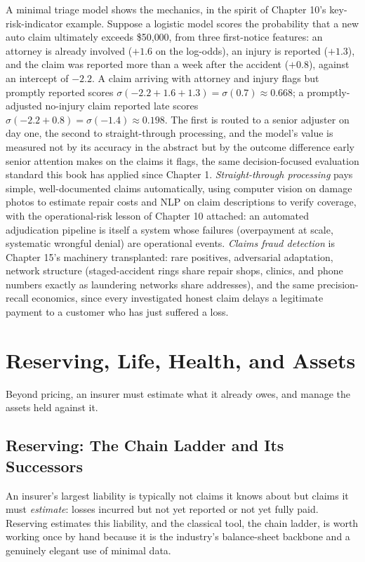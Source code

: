 \documentclass[../ai_in_finance]{subfiles}
\begin{document}
A minimal triage model shows the mechanics, in the spirit of Chapter 10's key-risk-indicator example. Suppose a logistic model scores the probability that a new auto claim ultimately exceeds \$50{,}000, from three first-notice features: an attorney is already involved ($+1.6$ on the log-odds), an injury is reported ($+1.3$), and the claim was reported more than a week after the accident ($+0.8$), against an intercept of $-2.2$. A claim arriving with attorney and injury flags but promptly reported scores $\sigma(-2.2 + 1.6 + 1.3) = \sigma(0.7) \approx 0.668$; a promptly-adjusted no-injury claim reported late scores $\sigma(-2.2 + 0.8) = \sigma(-1.4) \approx 0.198$. The first is routed to a senior adjuster on day one, the second to straight-through processing, and the model's value is measured not by its accuracy in the abstract but by the outcome difference early senior attention makes on the claims it flags, the same decision-focused evaluation standard this book has applied since Chapter 1. \emph{Straight-through processing} pays simple, well-documented claims automatically, using computer vision on damage photos to estimate repair costs and NLP on claim descriptions to verify coverage, with the operational-risk lesson of Chapter 10 attached: an automated adjudication pipeline is itself a system whose failures (overpayment at scale, systematic wrongful denial) are operational events. \emph{Claims fraud detection} is Chapter 15's machinery transplanted: rare positives, adversarial adaptation, network structure (staged-accident rings share repair shops, clinics, and phone numbers exactly as laundering networks share addresses), and the same precision-recall economics, since every investigated honest claim delays a legitimate payment to a customer who has just suffered a loss.

\section{Reserving, Life, Health, and Assets}

Beyond pricing, an insurer must estimate what it already owes, and manage the assets held against it.

\subsection{Reserving: The Chain Ladder and Its Successors}
\label{sec:ins-reserving}

An insurer's largest liability is typically not claims it knows about but claims it must \emph{estimate}: losses incurred but not yet reported or not yet fully paid. Reserving estimates this liability, and the classical tool, the chain ladder, is worth working once by hand because it is the industry's balance-sheet backbone and a genuinely elegant use of minimal data.
\end{document}
